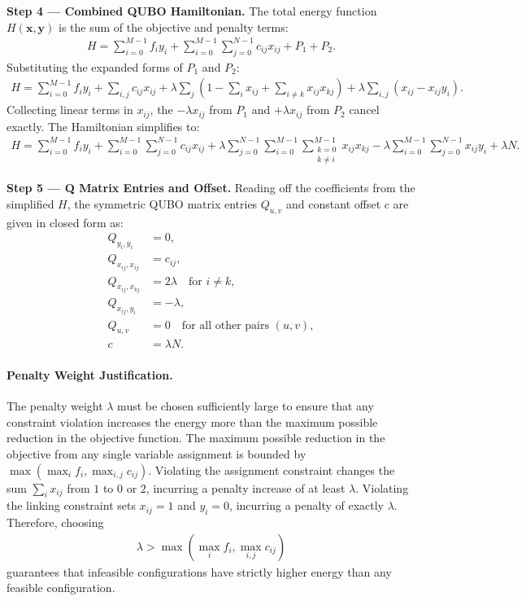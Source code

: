 \documentclass[12pt]{article}
\begin{document}
\textbf{Step 4 --- Combined QUBO Hamiltonian.}
The total energy function $H(\mathbf{x},\mathbf{y})$ is the sum of the objective and penalty terms:
\begin{align}
H = \sum_{i=0}^{M-1} f_i y_i + \sum_{i=0}^{M-1} \sum_{j=0}^{N-1} c_{ij} x_{ij} + P_1 + P_2.
\end{align}
Substituting the expanded forms of $P_1$ and $P_2$:
\begin{align}
H = \sum_{i=0}^{M-1} f_i y_i + \sum_{i,j} c_{ij} x_{ij} + \lambda \sum_{j} \left( 1 - \sum_{i} x_{ij} + \sum_{i \neq k} x_{ij} x_{kj} \right) + \lambda \sum_{i,j} (x_{ij} - x_{ij} y_i).
\end{align}
Collecting linear terms in $x_{ij}$, the $-\lambda x_{ij}$ from $P_1$ and $+\lambda x_{ij}$ from $P_2$ cancel exactly. The Hamiltonian simplifies to:
\begin{align}
H = \sum_{i=0}^{M-1} f_i y_i + \sum_{i=0}^{M-1} \sum_{j=0}^{N-1} c_{ij} x_{ij} + \lambda \sum_{j=0}^{N-1} \sum_{i=0}^{M-1} \sum_{\substack{k=0 \\ k \neq i}}^{M-1} x_{ij} x_{kj} - \lambda \sum_{i=0}^{M-1} \sum_{j=0}^{N-1} x_{ij} y_i + \lambda N.
\end{align}

\textbf{Step 5 --- Q Matrix Entries and Offset.}
Reading off the coefficients from the simplified $H$, the symmetric QUBO matrix entries $Q_{u,v}$ and constant offset $c$ are given in closed form as:
\begin{align}
Q_{y_i, y_i} &= 0, \nonumber \\
Q_{x_{ij}, x_{ij}} &= c_{ij}, \nonumber \\
Q_{x_{ij}, x_{kj}} &= 2\lambda \quad \text{for } i \neq k, \nonumber \\
Q_{x_{ij}, y_i} &= -\lambda, \nonumber \\
Q_{u,v} &= 0 \quad \text{for all other pairs } (u,v), \nonumber \\
c &= \lambda N.
\end{align}

\paragraph{Penalty Weight Justification.}
The penalty weight $\lambda$ must be chosen sufficiently large to ensure that any constraint violation increases the energy more than the maximum possible reduction in the objective function. The maximum possible reduction in the objective from any single variable assignment is bounded by $\max(\max_{i} f_i, \max_{i,j} c_{ij})$. Violating the assignment constraint changes the sum $\sum_i x_{ij}$ from $1$ to $0$ or $2$, incurring a penalty increase of at least $\lambda$. Violating the linking constraint sets $x_{ij}=1$ and $y_i=0$, incurring a penalty of exactly $\lambda$. Therefore, choosing
\begin{align}
\lambda > \max\left( \max_{i} f_i, \max_{i,j} c_{ij} \right)
\end{align}
guarantees that infeasible configurations have strictly higher energy than any feasible configuration.
\end{document}

